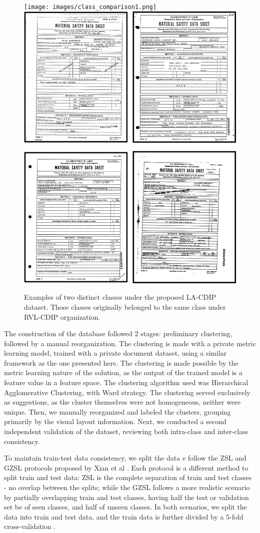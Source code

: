 \begin{figure}[htbp]
  \centering
\texttt{[image: images/class\_comparison1.png]} \hspace{.1\textwidth}
    \includegraphics[width=.4\textwidth]{images/class_comparison2.png}

\caption{Examples of two distinct classes under the proposed \gls{LA-CDIP} dataset. Those classes originally belonged to the same class under RVL-CDIP organization.\label{img:dataset}}
\end{figure}   

The construction of the database followed 2 stages: preliminary clustering, followed by a manual reorganization. The clustering is made with a private metric learning model, trained with a private document dataset, using a similar framework as the one presented here. The clustering is made possible by the metric learning nature of the solution, as the output of the trained model is a feature value in a feature space. The clustering algorithm used was Hierarchical Agglomerative Clustering, with Ward\cite{ward1963} strategy. The clustering served exclusively as suggestions, as the cluster themselves were not homogeneous, neither were unique. Then, we manually reorganized and labeled the clusters, grouping primarily by the visual layout information. Next, we conducted a second independent validation of the dataset, reviewing both intra-class and inter-class consistency.

To maintain train-test data consistency, we split the data e follow the \gls{ZSL} and \gls{GZSL} protocols proposed by Xian et al \cite{gzsl}. Each protocol is a different method to split train and test data: \gls{ZSL} is the complete separation of train and test classes - no overlap between the splits; while the \gls{GZSL} follows a more realistic scenario by partially overlapping train and test classes, having half the test or validation set be of seen classes, and half of unseen classes. In both scenarios, we split the data into train and test data, and the train data is further divided by a 5-fold cross-validation \cite{kfoldcv}.

